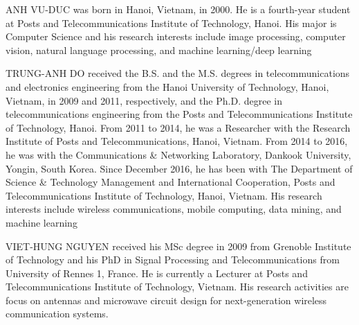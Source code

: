 \documentclass{ieeeaccess}
\begin{document}
\begin{IEEEbiography}{ANH VU-DUC} was born in Hanoi, Vietnam, in 2000. He is a fourth-year student at Posts and Telecommunications Institute of Technology, Hanoi. His major is Computer Science and his research interests include image processing, computer vision, natural language processing, and machine learning/deep learning
\end{IEEEbiography}

\begin{IEEEbiography}{TRUNG-ANH DO} received the B.S. and the M.S. degrees in telecommunications and electronics
engineering from the Hanoi University of Technology, Hanoi, Vietnam, in 2009 and 2011, respectively, and the Ph.D. degree
in telecommunications engineering from the Posts and Telecommunications Institute of Technology, Hanoi. From 2011 to 2014, he was a Researcher with the Research Institute of Posts and Telecommunications, Hanoi, Vietnam. From 2014 to 2016, he was
with the Communications \& Networking Laboratory, Dankook University, Yongin, South Korea. Since December 2016, he has been with The Department of Science \& Technology Management and International Cooperation, Posts and Telecommunications Institute of Technology, Hanoi, Vietnam.  His research interests include wireless communications, mobile computing, data mining, and machine learning
\end{IEEEbiography}

\begin{IEEEbiography}{VIET-HUNG NGUYEN} received his MSc degree in 2009 from Grenoble Institute of Technology and his PhD in Signal Processing and Telecommunications from University of Rennes 1, France. He is currently a Lecturer at Posts and Telecommunications Institute of Technology, Vietnam. His research activities are focus on antennas and microwave circuit design for next-generation wireless communication systems. 
\end{IEEEbiography}
\end{document}
